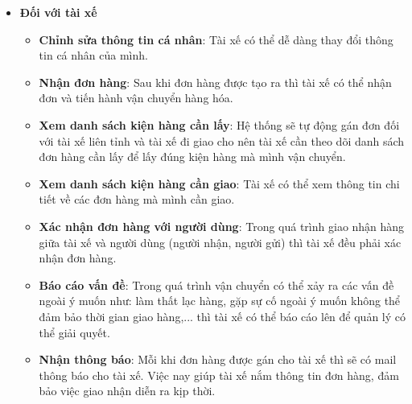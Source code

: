 \begin{itemize}
\begin{itemize}
				    \end{itemize}
				
			         
				\item \textbf{Đối với tài xế}
	                \begin{itemize}
	                    \item \textbf{Chỉnh sửa thông tin cá nhân}: Tài xế có thể dễ dàng thay đổi thông tin cá nhân của mình.
	                    \item \textbf{Nhận đơn hàng}: Sau khi đơn hàng được tạo ra thì tài xế có thể nhận đơn và tiến hành vận chuyển hàng hóa.
	                    \item \textbf{Xem danh sách kiện hàng cần lấy}: Hệ thống sẽ tự động gán đơn đối với tài xế liên tỉnh và tài xế đi giao cho nên tài xế cần theo dõi danh sách đơn hàng cần lấy để lấy đúng kiện hàng mà mình vận chuyển.
	                    \item \textbf{Xem danh sách kiện hàng cần giao}: Tài xế có thể xem thông tin chi tiết về các đơn hàng mà mình cần giao.
	                    \item \textbf{Xác nhận đơn hàng với người dùng}: Trong quá trình giao nhận hàng giữa tài xế và người dùng (người nhận, người gửi) thì tài xế đều phải xác nhận đơn hàng.
	                    \item \textbf{Báo cáo vấn đề}: Trong quá trình vận chuyển có thể xảy ra các vấn đề ngoài ý muốn như: làm thất lạc hàng, gặp sự cố ngoài ý muốn không thể đảm bảo thời gian giao hàng,... thì tài xế có thể báo cáo lên để quản lý có thể giải quyết.
	                    \item \textbf{Nhận thông báo}: Mỗi khi đơn hàng được gán cho tài xế thì sẽ có mail thông báo cho tài xế. Việc nay giúp tài xế nắm thông tin đơn hàng, đảm bảo việc giao nhận diễn ra kịp thời.
	                \end{itemize}
	                

\end{itemize}
